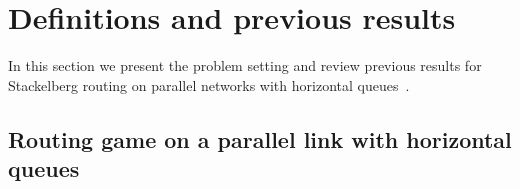 
\section{Definitions and previous results}
\label{sec:previous}

In this section we present the problem setting and review previous results for Stackelberg routing on parallel networks with horizontal queues~\cite{krichene12}.




\subsection{Routing game on a parallel link with horizontal queues}
\label{sec:previous-Nash}

